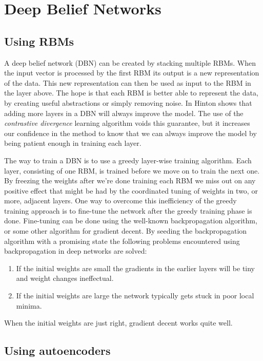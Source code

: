 \documentclass[11pt]{article}
\begin{document}
\section{Deep Belief Networks}

\subsection{Using RBMs}

A deep belief network (DBN) can be created by stacking multiple RBMs.  When the input vector is processed by the first RBM its output is a new representation of the data.  This new representation can then be used as input to the RBM in the layer above.  The hope is that each RBM is better able to represent the data, by creating useful abstractions or simply removing noise.  In \cite{hinton06} Hinton shows that adding more layers in a DBN will always improve the model.  The use of the \textit{contrastive divergence} learning algorithm voids this guarantee, but it increases our confidence in the method to know that we can always improve the model by being patient enough in training each layer.

The way to train a DBN is to use a greedy layer-wise training algorithm.  Each layer, consisting of one RBM, is trained before we move on to train the next one.  By freezing the weights after we're done training each RBM we miss out on any positive effect that might be had by the coordinated tuning of weights in two, or more, adjacent layers.  One way to overcome this inefficiency of the greedy training approach is to fine-tune the network after the greedy training phase is done.  Fine-tuning can be done using the well-known backpropagation algorithm, or some other algorithm for gradient decent.  By seeding the backpropagation algorithm with a promising state the following problems encountered using backpropagation in deep networks are solved\cite{hinton06reducing}:
\begin{enumerate}
\item If the initial weights are small the gradients in the earlier layers will be tiny and weight changes ineffectual.
\item If the initial weights are large the network typically gets stuck in poor local minima.
\end{enumerate}

When the initial weights are just right, gradient decent works quite well.

\subsection{Using autoencoders}
\end{document}

